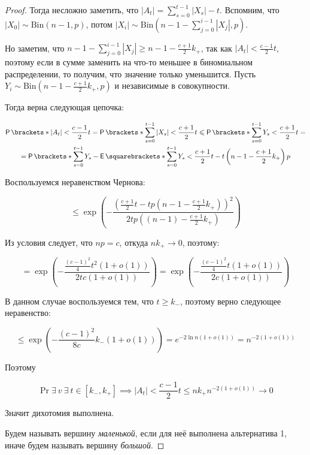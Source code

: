 \begin{proof}
  Тогда несложно заметить, что $|A_t| = \sum\limits_{s = 0}^{t - 1} |X_s| - t$.
  Вспомним, что $|X_0| \sim \mathrm{Bin}(n - 1, p)$, потом $|X_i| \sim 
  \mathrm{Bin}\left(n - 1 - \sum\limits_{j = 0}^{i - 1} |X_j|, p\right)$.

  Но заметим, что $n - 1 - \sum\limits_{j = 0}^{i - 1} |X_j| \geq n - 1
  - \frac{c + 1}{2}k_+$, так как $|A_t| < \frac{c - 1}{2}t$, поэтому если в 
  сумме заменить на что-то меньшее в биномиальном распределении, то получим, что
  значение только уменьшится. Пусть $Y_i \sim \mathrm{Bin}(n - 1 - 
  \frac{c + 1}{2}k_+, p)$ и независимые в совокупности.

  Тогда верна следующая цепочка:

  \begin{multline}
    \Pr{|A_t| < \frac{c - 1}{2}t} = \Pr{\sum\limits_{s = 0}^{t - 1} |X_s| <
    \frac{c + 1}{2} t} \leq \Pr{\sum\limits_{s = 0}^{t - 1} Y_s < \frac{c +
    1}{2} t} =\\= \Pr{\sum\limits_{s = 0}^{t - 1} Y_s - \E{\sum\limits_{s =
    0}^{t - 1} Y_s} < \frac{c + 1}{2}t - t\left(n - 1 - 
    \frac{c + 1}{2}k_+\right)p} 
  \end{multline}

  Воспользуемся неравенством Чернова:

  \[
  \leq  \exp\left(-\frac{\left(\frac{c + 1}{2}t
    - tp(n - 1 - \frac{c + 1}{2}k_+)\right)^2}{2tp((n - 1) - \frac{c + 1}{2}k_+
    )}\right)
  \]

  Из условия следует, что $np = c$, откуда $nk_+ \to 0$, поэтому:

  \[
    = \exp\left(-\frac{\frac{(c - 1)^2}{4} t^2 (1 + o(1))}{2tc(1 + o(1))}\right) =
    \exp\left(-\frac{\frac{(c - 1)^2}{4} t (1 + o(1))}{2c(1 + o(1))}\right)
  \]

  В данном случае воспользуемся тем, что $t \geq k_-$, поэтому верно следующее
  неравенство:

  \[
    \leq \exp\left(-\frac{(c - 1)^2}{8c}k_-(1 + o(1))\right) = 
    e^{-2\ln n (1 + o(1))} = n^{-2(1 + o(1))}
  \]

  Поэтому

  \[
    \Pr{\exists \ v \ \exists \ t \in [k_-, k_+] \implies |A_t| < \frac{c - 1}{2}t} \leq
    nk_+ n^{-2(1 + o(1))} \to 0
  \]

  Значит дихотомия выполнена.
  
  Будем называть вершину \textit{маленькой}, если для неё выполнена альтернатива
  1, иначе будем называть вершину \textit{большой}.


\end{proof}
